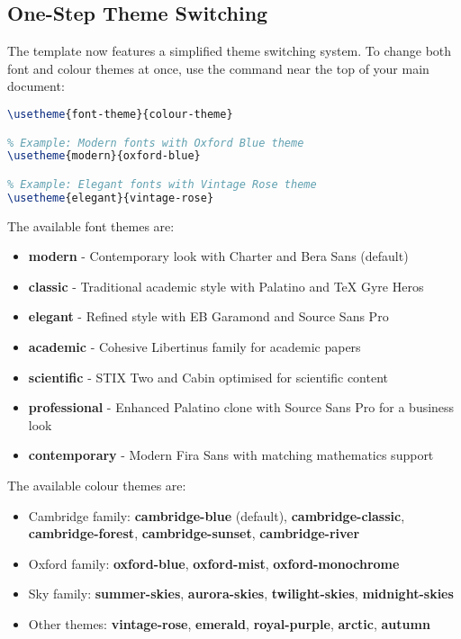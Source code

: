 \documentclass[a4paper,11pt]{article}
\begin{document}
\subsection{One-Step Theme Switching}
The template now features a simplified theme switching system. To change both font and colour themes at once, use the \inlinecode{\\usetheme} command near the top of your main document:

\begin{lstlisting}[language=TeX, caption={Using the theme switcher command}, label={lst:themeswitcher}]
% Select your theme - first parameter is font theme, second is colour theme
\usetheme{font-theme}{colour-theme}

% Example: Modern fonts with Oxford Blue theme
\usetheme{modern}{oxford-blue}

% Example: Elegant fonts with Vintage Rose theme
\usetheme{elegant}{vintage-rose}
\end{lstlisting}

The available font themes are:
\begin{itemize}
    \item \textbf{modern} - Contemporary look with Charter and Bera Sans (default)
    \item \textbf{classic} - Traditional academic style with Palatino and TeX Gyre Heros
    \item \textbf{elegant} - Refined style with EB Garamond and Source Sans Pro
    \item \textbf{academic} - Cohesive Libertinus family for academic papers
    \item \textbf{scientific} - STIX Two and Cabin optimised for scientific content
    \item \textbf{professional} - Enhanced Palatino clone with Source Sans Pro for a business look
    \item \textbf{contemporary} - Modern Fira Sans with matching mathematics support
\end{itemize}

The available colour themes are:
\begin{itemize}
    \item Cambridge family: \textbf{cambridge-blue} (default), \textbf{cambridge-classic}, \textbf{cambridge-forest}, \textbf{cambridge-sunset}, \textbf{cambridge-river}
    \item Oxford family: \textbf{oxford-blue}, \textbf{oxford-mist}, \textbf{oxford-monochrome}
    \item Sky family: \textbf{summer-skies}, \textbf{aurora-skies}, \textbf{twilight-skies}, \textbf{midnight-skies}
    \item Other themes: \textbf{vintage-rose}, \textbf{emerald}, \textbf{royal-purple}, \textbf{arctic}, \textbf{autumn}
\end{itemize}
\end{document}
